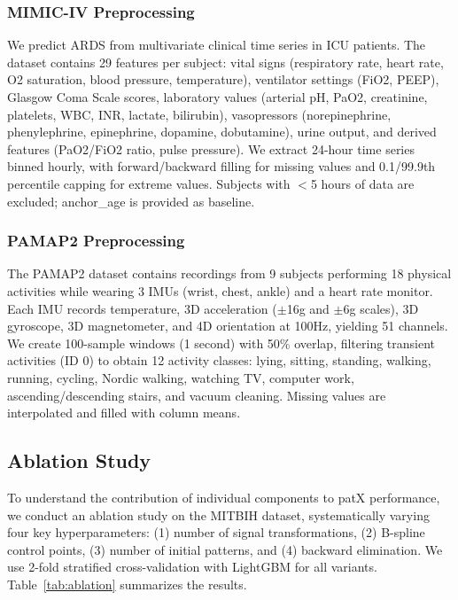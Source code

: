 \documentclass[11pt]{article}
\begin{document}
\subsubsection{MIMIC-IV Preprocessing}

We predict ARDS from multivariate clinical time series in ICU patients.
The dataset contains 29 features per subject: vital signs (respiratory rate,
heart rate, O2 saturation, blood pressure, temperature), ventilator settings
(FiO2, PEEP), Glasgow Coma Scale scores, laboratory values (arterial pH, PaO2,
creatinine, platelets, WBC, INR, lactate, bilirubin), vasopressors (norepinephrine,
phenylephrine, epinephrine, dopamine, dobutamine), urine output, and derived
features (PaO2/FiO2 ratio, pulse pressure).
We extract 24-hour time series binned hourly, with forward/backward filling for
missing values and 0.1/99.9th percentile capping for extreme values.
Subjects with $<$5 hours of data are excluded; anchor\_age is provided as baseline.

\subsubsection{PAMAP2 Preprocessing}

The PAMAP2 dataset contains recordings from 9 subjects performing 18 physical
activities while wearing 3 IMUs (wrist, chest, ankle) and a heart rate monitor.
Each IMU records temperature, 3D acceleration ($\pm$16g and $\pm$6g scales),
3D gyroscope, 3D magnetometer, and 4D orientation at 100Hz, yielding 51 channels.
We create 100-sample windows (1 second) with 50\% overlap, filtering transient
activities (ID 0) to obtain 12 activity classes: lying, sitting, standing, walking,
running, cycling, Nordic walking, watching TV, computer work, ascending/descending
stairs, and vacuum cleaning.
Missing values are interpolated and filled with column means.

\subsection{Ablation Study}

To understand the contribution of individual components to patX performance, we
conduct an ablation study on the MITBIH dataset, systematically varying four key
hyperparameters: (1) number of signal transformations, (2) B-spline control points,
(3) number of initial patterns, and (4) backward elimination.
We use 2-fold stratified cross-validation with LightGBM for all variants.
Table~\ref{tab:ablation} summarizes the results.
\end{document}
